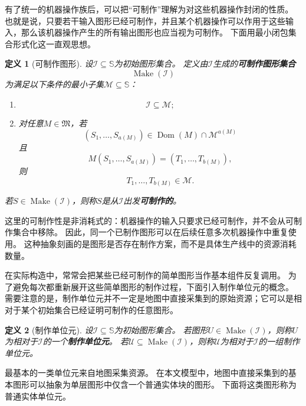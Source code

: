 \documentclass[UTF8,fontset=none]{ctexart}
\theoremstyle{cnthm}
\newtheorem{definition}{定义}[section]
\begin{document}
			有了统一的机器操作族后，可以把“可制作”理解为对这些机器操作封闭的性质。
			也就是说，只要若干输入图形已经可制作，并且某个机器操作可以作用于这些输入，那么该机器操作产生的所有输出图形也应当视为可制作。
			下面用最小闭包集合形式化这一直观思想。
			
			\begin{definition}[可制作图形]
				设$\mathcal{I}\subseteq\mathbb{S}$为初始图形集合。
				定义由$\mathcal{I}$生成的\textbf{可制作图形集合}
				$$
				\operatorname{Make}(\mathcal{I})
				$$
				为满足以下条件的最小子集$\mathcal{M}\subseteq\mathbb{S}$：
				\begin{enumerate}
					\item
					$$
					\mathcal{I}\subseteq\mathcal{M};
					$$
					
					\item 对任意$M\in\mathfrak{M}$，若
					$$
					(S_1,\dots,S_{a(M)})\in \operatorname{Dom}(M)\cap \mathcal{M}^{a(M)}
					$$
					且
					$$
					M(S_1,\dots,S_{a(M)})
					=
					(T_1,\dots,T_{b(M)}),
					$$
					则
					$$
					T_1,\dots,T_{b(M)}\in\mathcal{M}.
					$$
				\end{enumerate}
				
				若$S\in\operatorname{Make}(\mathcal{I})$，则称$S$是从$\mathcal{I}$出发\textbf{可制作的}。
			\end{definition}
			
			这里的可制作性是非消耗式的：机器操作的输入只要求已经可制作，并不会从可制作集合中移除。
			因此，同一个已制作图形可以在后续任意多次机器操作中重复使用。
			这种抽象刻画的是图形是否存在制作方案，而不是具体生产线中的资源消耗数量。
			
			在实际构造中，常常会把某些已经可制作的简单图形当作基本组件反复调用。
			为了避免每次都重新展开这些简单图形的制作过程，下面引入制作单位元的概念。
			需要注意的是，制作单位元并不一定是地图中直接采集到的原始资源；它可以是相对于某个初始集合已经证明可制作的任意图形。
			
			\begin{definition}[制作单位元]
				设$\mathcal{I}\subseteq\mathbb{S}$为初始图形集合。
				若图形$U\in\operatorname{Make}(\mathcal{I})$，则称$U$为相对于$\mathcal{I}$的一个\textbf{制作单位元}。
				若$\mathcal{U}\subseteq\operatorname{Make}(\mathcal{I})$，则称$\mathcal{U}$为相对于$\mathcal{I}$的一组制作单位元。
			\end{definition}
			
			最基本的一类单位元来自地图采集资源。
			在本文模型中，地图中直接采集到的基本图形可以抽象为单层图形中仅含一个普通实体块的图形。
			下面将这类图形称为普通实体单位元。
			
\end{document}
